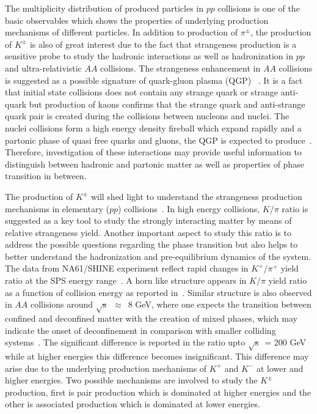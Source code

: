 \documentclass{article}
\newcommand{\sqrts}{\mbox{$\sqrt{\mathrm{s}}$}}
\begin{document}
The multiplicity distribution of produced particles in $pp$ collisions is one of the basic observables which shows the properties of underlying production mechanisms of different particles. In addition to production of $\pi^\pm$, the production of $K^\pm$ is also of great interest due to the fact that strangeness production is a sensitive probe to study the hadronic interactions as well as hadronization in $pp$ and ultra-relativistic $AA$ collisions. The strangeness enhancement in $AA$ collisions is suggested as a possible signature of quark-gluon plasma (QGP) ~\cite{5}. It is a fact that initial state collisions does not contain any strange quark or strange anti-quark but production of kaons confirms that the strange quark and anti-strange quark pair is created during the collisions between nucleons and nuclei. The nuclei collisions form a high energy density fireball which expand rapidly and a partonic phase of quasi free quarks and gluons, the QGP is expected to produce~\cite{6}. Therefore, investigation of these interactions may provide useful information to distinguish between hadronic and partonic matter as well as properties of phase transition in between.

The production of $K^\pm$ will shed light to understand the strangeness production mechanisms in elementary ($pp$) collisions~\cite{5}. In high energy collisions, $K/\pi$ ratio is suggested as a key tool to study the strongly interacting matter by means of relative strangeness yield. Another important aspect to study this ratio is to address the possible questions regarding the phase transition but also helps to better understand the hadronization and pre-equilibrium dynamics of the system. The data from NA61/SHINE experiment reflect rapid changes in $K^+/\pi^+$ yield ratio at the SPS energy range~\cite{NA49:2002pzu, NA49:2007stj, Pulawski:2015tka}. A horn like structure appears in $K/\pi$ yield ratio as a function of collision energy as reported in~\cite{NA49:2002pzu, NA49:2007stj, Pulawski:2015tka}. Similar structure is also observed in $AA$ collisions around \sqrts~$\approx$~8 GeV, where one expects the transition between confined and deconfined matter with the creation of mixed phases, which may indicate the onset of deconfinement in comparison with smaller colliding systems~\cite{Gazdzicki:2010iv, 7}. The significant difference is reported in the ratio upto \sqrts~= 200 GeV while at higher energies this difference becomes insignificant. This difference may arise due to the underlying production mechanisms of $K^+$ and $K^-$ at lower and higher energies. Two possible mechanisms are involved to study the $K^\pm$ production, first is pair production which is dominated at higher energies and the other is associated production which is dominated at lower energies. 
\end{document}
